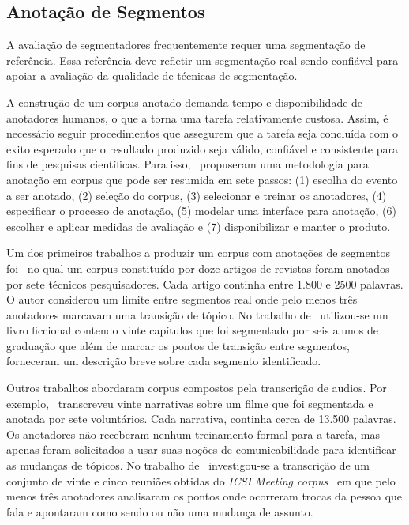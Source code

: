 \subsection{Anotação de Segmentos}
\label{sec:anotacoes}
A avaliação de segmentadores frequentemente requer uma segmentação de referência. Essa referência deve refletir um segmentação real sendo confiável para apoiar a avaliação da qualidade de técnicas de segmentação. 

A construção de um corpus anotado demanda tempo e disponibilidade de anotadores humanos, o que a torna uma tarefa relativamente custosa. 
Assim, é necessário seguir procedimentos que assegurem que a tarefa seja concluída com o exito esperado que o resultado produzido seja válido, confiável e consistente para fins de pesquisas científicas. Para isso,~\cite{Hovy2010} propuseram uma metodologia para anotação em corpus que pode ser resumida em sete passos: 
(1) escolha do evento a ser anotado, %
(2) seleção do corpus, %
(3) selecionar e treinar os anotadores,
(4) especificar o processo de anotação,
(5) modelar uma interface para anotação,
(6) escolher e aplicar medidas de avaliação e 
(7) disponibilizar e manter o produto.
% 

Um dos primeiros trabalhos a produzir um corpus com anotações de segmentos foi~\cite{Hearst1997} no qual um corpus constituído por doze artigos de revistas foram anotados por sete técnicos pesquisadores. Cada artigo continha entre 1.800 e 2500 palavras. O autor considerou um limite entre segmentos real onde pelo menos três anotadores marcavam uma transição de tópico. No trabalho de~\cite{Kazantseva2012} utilizou-se um livro ficcional contendo vinte capítulos que foi segmentado por seis alunos de graduação que além de marcar os pontos de transição entre segmentos, forneceram um descrição breve sobre cada segmento identificado. 

Outros trabalhos abordaram corpus compostos pela transcrição de audios. Por exemplo,~\cite{Passonneau1997} transcreveu vinte narrativas sobre um filme que foi segmentada e anotada por sete voluntários. Cada narrativa, continha cerca de 13.500 palavras. Os anotadores não receberam nenhum treinamento formal para a tarefa, mas apenas foram solicitados a usar suas noções de comunicabilidade para identificar as mudanças de tópicos. No trabalho de~\cite{Galley2003} investigou-se a transcrição de um conjunto de vinte e cinco reuniões obtidas do \textit{ICSI Meeting corpus}~\cite{Janin2003} em que pelo menos três anotadores analisaram os pontos onde ocorreram trocas da pessoa que fala e apontaram como sendo ou não uma mudança de assunto.  


